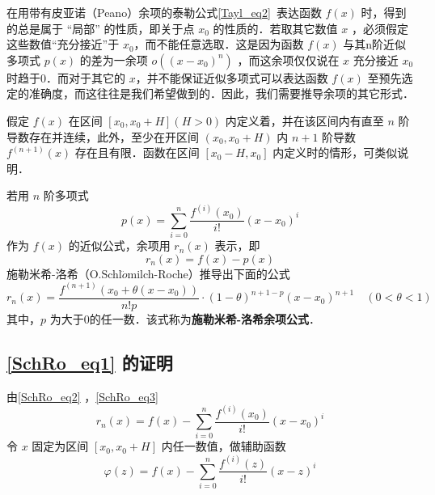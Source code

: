 
在用带有皮亚诺（Peano）余项的泰勒公式\autoref{Tayl_eq2}~表达函数 $f(x)$ 时，得到的总是属于 “局部” 的性质，即关于点 $x_0$ 的性质的．若取其它数值 $x$ ，必须假定这些数值“充分接近”于 $x_0$，而不能任意选取．这是因为函数 $f(x)$ 与其n阶近似多项式 $p(x)$ 的差为一余项 $o((x-x_0)^n)$ ，而这余项仅仅说在 $x$ 充分接近 $x_0$ 时趋于0．而对于其它的 $x$，并不能保证近似多项式可以表达函数 $f(x)$ 至预先选定的准确度，而这往往是我们希望做到的．因此，我们需要推导余项的其它形式．

假定 $f(x)$ 在区间 $[x_0,x_0+H](H>0)$ 内定义着，并在该区间内有直至 $n$ 阶导数存在并连续，此外，至少在开区间 $(x_0,x_0+H)$ 内 $n+1$ 阶导数 $f^{(n+1)}(x)$ 存在且有限．函数在区间 $[x_0-H,x_0]$ 内定义时的情形，可类似说明．

若用 $n$ 阶多项式
\begin{equation}\label{SchRo_eq2}
p(x)=\sum_{i=0}^n\frac{f^{(i)}(x_0)}{i!}(x-x_0)^i
\end{equation}
作为 $f(x)$ 的近似公式，余项用 $r_n(x)$ 表示，即 
\begin{equation}\label{SchRo_eq3}
r_n(x)=f(x)-p(x)
\end{equation}
施勒米希-洛希（O.Schl$\ddot{o}$milch-Roche）推导出下面的公式
\begin{equation}\label{SchRo_eq1}
r_n(x)=\frac{f^{(n+1)}(x_0+\theta(x-x_0))}{n!p}\cdot(1-\theta)^{n+1-p}(x-x_0)^{n+1}\quad (0<\theta<1)
\end{equation}
其中，$p$ 为大于0的任一数．该式称为\textbf{施勒米希-洛希余项公式}．
\subsection{\autoref{SchRo_eq1} 的证明}
由\autoref{SchRo_eq2} ，\autoref{SchRo_eq3} 
\begin{equation}
r_n(x)=f(x)-\sum_{i=0}^n\frac{f^{(i)}(x_0)}{i!}(x-x_0)^i
\end{equation}
令 $x$ 固定为区间 $[x_0,x_0+H]$ 内任一数值，做辅助函数
\begin{equation}
\varphi(z)=f(x)-\sum_{i=0}^n\frac{f^{(i)}(z)}{i!}(x-z)^i
\end{equation}

